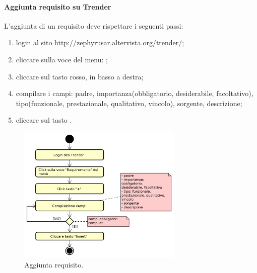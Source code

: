 	    \paragraph{Aggiunta requisito su Trender}
	    L'aggiunta di un requisito deve rispettare i seguenti passi:
	    \begin{enumerate}
			\item login al sito \url{http://zephyrusar.altervista.org/trender/};
			\item cliccare sulla voce del menu: ;
			\item cliccare sul tasto \hicode{+} rosso, in basso a destra;
			\item compilare i campi: padre, importanza(obbligatorio, desiderabile, facoltativo), tipo(funzionale, prestazionale, qualitativo, vincolo), sorgente, descrizione;
			\item cliccare sul tasto .
		\end{enumerate}
		\begin{figure}[H]
			\centering
			\includegraphics[width=0.7\textwidth]{img/AggiuntaReq}
			\caption{Aggiunta requisito.}
		\end{figure}
			    
